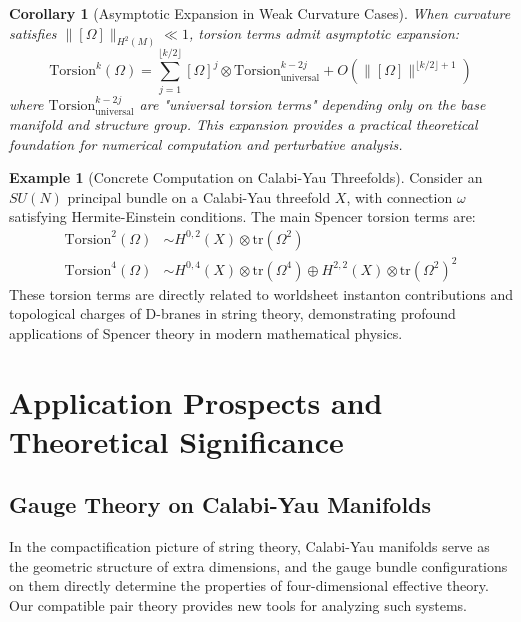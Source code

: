 \documentclass[a4paper,12pt]{extarticle}
\newtheorem{corollary}[theorem]{Corollary}
\theoremstyle{definition}
\newtheorem{example}{Example}
\begin{document}
\begin{corollary}[Asymptotic Expansion in Weak Curvature Cases]
When curvature satisfies $\|[\Omega]\|_{H^2(M)} \ll 1$, torsion terms admit asymptotic expansion:
$$\text{Torsion}^k(\Omega) = \sum_{j=1}^{\lfloor k/2 \rfloor} [\Omega]^j \otimes \text{Torsion}^{k-2j}_{\text{universal}} + O(\|[\Omega]\|^{\lfloor k/2 \rfloor + 1})$$
where $\text{Torsion}^{k-2j}_{\text{universal}}$ are "universal torsion terms" depending only on the base manifold and structure group. This expansion provides a practical theoretical foundation for numerical computation and perturbative analysis.
\end{corollary}

\begin{example}[Concrete Computation on Calabi-Yau Threefolds]
Consider an $SU(N)$ principal bundle on a Calabi-Yau threefold $X$, with connection $\omega$ satisfying Hermite-Einstein conditions. The main Spencer torsion terms are:
\begin{align}
\text{Torsion}^2(\Omega) &\sim H^{0,2}(X) \otimes \text{tr}(\Omega^2) \\
\text{Torsion}^4(\Omega) &\sim H^{0,4}(X) \otimes \text{tr}(\Omega^4) \oplus H^{2,2}(X) \otimes \text{tr}(\Omega^2)^2
\end{align}
These torsion terms are directly related to worldsheet instanton contributions and topological charges of D-branes in string theory, demonstrating profound applications of Spencer theory in modern mathematical physics.
\end{example}

\section{Application Prospects and Theoretical Significance}

\subsection{Gauge Theory on Calabi-Yau Manifolds}

In the compactification picture of string theory, Calabi-Yau manifolds serve as the geometric structure of extra dimensions, and the gauge bundle configurations on them directly determine the properties of four-dimensional effective theory. Our compatible pair theory provides new tools for analyzing such systems.
\end{document}
